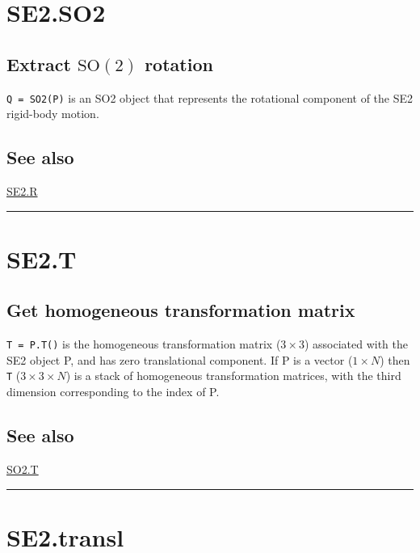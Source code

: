 \hypertarget{SE2.SO2}{\section*{SE2.SO2}}
\subsection*{Extract $\mbox{SO}(2)$ rotation}


\texttt{Q = SO2(P)} is an SO2 object that represents the rotational component of
the SE2 rigid-body motion.


\subsection*{See also}


\hyperlink{SE2.R}{\color{blue} SE2.R}

\vspace{1.5ex}\hrule

\hypertarget{SE2.T}{\section*{SE2.T}}
\subsection*{Get homogeneous transformation matrix}


\texttt{T = P.T()} is the homogeneous transformation matrix ($3 \times 3$) associated with the
SE2 object P, and has zero translational component.  If P is a vector
($1 \times N$) then \texttt{T} ($3 \times 3 \times N$) is a stack of homogeneous transformation matrices, with the third
dimension corresponding to the index of P.


\subsection*{See also}


\hyperlink{SO2.T}{\color{blue} SO2.T}

\vspace{1.5ex}\hrule

\hypertarget{SE2.transl}{\section*{SE2.transl}}
